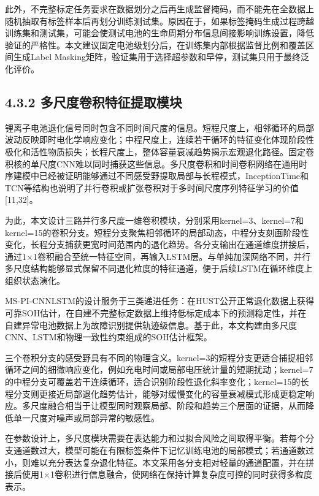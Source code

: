 \documentclass[12pt, a4paper]{ctexart}
\begin{document}
此外，不完整标定任务要求在数据划分之后再生成监督掩码，而不能先在全数据上随机抽取有标签样本后再划分训练测试集。原因在于，如果标签掩码生成过程跨越训练集和测试集，可能会使测试电池的生命周期分布信息间接影响训练设置，降低验证的严格性。本文建议固定电池级划分后，在训练集内部根据监督比例和覆盖区间生成Label Masking矩阵，验证集用于选择超参数和早停，测试集只用于最终泛化评价。



\subsection{4.3.2 多尺度卷积特征提取模块}

锂离子电池退化信号同时包含不同时间尺度的信息。短程尺度上，相邻循环的局部波动反映即时电化学响应变化；中程尺度上，连续若干循环的特征变化体现阶段性极化和活性物质损失；长程尺度上，整体容量衰减趋势揭示宏观退化路径。固定卷积核的单尺度CNN难以同时捕获这些信息。多尺度卷积和时间卷积网络在通用时序建模中已经被证明能够通过不同感受野提取局部与长程模式，InceptionTime和TCN等结构也说明了并行卷积或扩张卷积对于多时间尺度序列特征学习的价值[11,32]。


为此，本文设计三路并行多尺度一维卷积模块，分别采用kernel=3、kernel=7和kernel=15的卷积分支。短程分支聚焦相邻循环的局部动态，中程分支刻画阶段性变化，长程分支捕获更宽时间范围内的退化趋势。各分支输出在通道维度拼接后，通过1×1卷积融合至统一特征空间，再输入LSTM层。与单纯加深网络不同，并行多尺度结构能够显式保留不同退化粒度的特征通道，便于后续LSTM在循环维度上组织状态演化。


MS-PI-CNNLSTM的设计服务于三类递进任务：在HUST公开正常退化数据上获得可靠SOH估计，在自建不完整标定数据上维持低标定成本下的预测稳定性，并在自建异常电池数据上为故障识别提供轨迹级信息。基于此，本文构建由多尺度CNN、LSTM和物理一致性约束组成的SOH估计框架。


三个卷积分支的感受野具有不同的物理含义。kernel=3的短程分支更适合捕捉相邻循环之间的细微响应变化，例如充电时间或局部电压统计量的短期扰动；kernel=7的中程分支可覆盖若干连续循环，适合识别阶段性退化斜率变化；kernel=15的长程分支则更接近局部退化趋势估计，能够对缓慢变化的容量衰减模式形成更稳定响应。多尺度融合相当于让模型同时观察局部、阶段和趋势三个层面的证据，从而降低单一尺度对噪声或局部异常的敏感性。


在参数设计上，多尺度模块需要在表达能力和过拟合风险之间取得平衡。若每个分支通道数过大，模型可能在有限标签条件下记忆训练电池的局部模式；若通道数过小，则难以充分表达复杂退化特征。本文采用各分支相对轻量的通道配置，并在拼接后使用1×1卷积进行信息融合，使网络在保持计算复杂度可控的同时获得多粒度表示。
\end{document}
